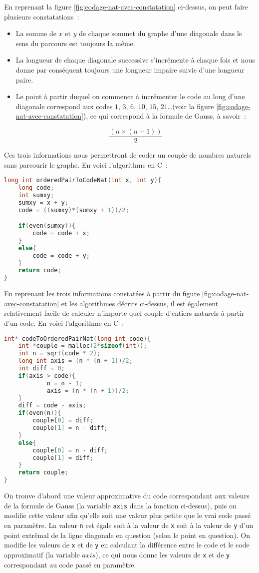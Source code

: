 \documentclass{article}
\begin{document}
En reprenant la figure \ref{fig:codage-nat-avec-constatation} ci-dessus, on peut faire plusieurs constatations~:

\begin{itemize}
\item La somme de $x$ et $y$ de chaque sommet du graphe d'une diagonale dans le sens du parcours est toujours la même.
\item La longueur de chaque diagonale successive s'incrémente à chaque fois et nous donne par conséquent toujours une longueur impaire suivie d'une longueur paire.
\item Le point à partir duquel on commence à incrémenter le code au long d'une diagonale correspond aux codes $1$, $3$, $6$, $10$, $15$, $21$\ldots (voir la figure \ref{fig:codage-nat-avec-constatation}), ce qui correspond à la formule de Gauss, à savoir~:

$$\dfrac{(n \times (n + 1))}{2}$$
\end{itemize}

Ces trois informations nous permettront de coder un couple de nombres naturels sans parcourir le graphe. En voici l'algorithme en C~:

\begin{lstlisting}[language=C]
long int orderedPairToCodeNat(int x, int y){
	long code;
	int sumxy; 
	sumxy = x + y;
	code = ((sumxy)*(sumxy + 1))/2;

	if(even(sumxy)){
		code = code + x;
	}
	else{
		code = code + y; 
	}
	return code;
}
\end{lstlisting}


En reprenant les trois informations constatées à partir du figure \ref{fig:codage-nat-avec-constatation} et les algorithmes décrits ci-dessus, il est également relativement facile de calculer n'importe quel couple d'entiers naturels à partir d'un code. En voici l'algorithme en C~:

\begin{lstlisting}[language=C]
int* codeToOrderedPairNat(long int code){
	int *couple = malloc(2*sizeof(int));
	int n = sqrt(code * 2);
	long int axis = (n * (n + 1))/2;
	int diff = 0;
	if(axis > code){
			n = n - 1;
			axis = (n * (n + 1))/2;
	}
	diff = code - axis;
	if(even(n)){
		couple[0] = diff;
		couple[1] = n - diff;
	}
	else{
		couple[0] = n - diff;
		couple[1] = diff;
	}
	return couple;
}
\end{lstlisting}

On trouve d'abord une valeur approximative du code correspondant aux valeurs de la formule de Gauss (la variable \lstinline!axis! dans la fonction ci-dessus), puis on modifie cette valeur afin qu'elle soit une valeur plus petite que le vrai code passé en paramètre. La valeur \lstinline!n! est égale soit à la valeur de \lstinline!x! soit à la valeur de \lstinline!y! d'un point extrêmal de la ligne diagonale en question (selon le point en question). On modifie les valeurs de \lstinline!x! et de \lstinline!y! en calculant la différence entre le code et le code approximatif (la variable $axis$), ce qui nous donne les valeurs de \lstinline!x! et de \lstinline!y! correspondant au code passé en paramètre.
\end{document}
